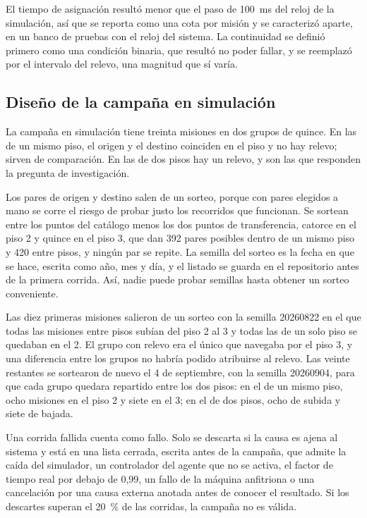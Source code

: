 El tiempo de asignación resultó menor que el paso de 100~ms del reloj de la
simulación, así que se reporta como una cota por misión y se caracterizó aparte,
en un banco de pruebas con el reloj del sistema. La continuidad se definió primero como una condición binaria, que resultó no poder fallar, y se reemplazó por el intervalo del relevo, una magnitud que sí varía.

\subsection{Diseño de la campaña en simulación}

La campaña en simulación tiene treinta misiones en dos grupos de quince. En las de un mismo piso, el origen y el destino coinciden en el piso y no hay relevo; sirven de comparación. En las de dos pisos hay un relevo, y son las que responden la pregunta de investigación.

Los pares de origen y destino salen de un sorteo, porque con pares elegidos a mano se corre el riesgo de probar justo los recorridos que funcionan. Se sortean entre los puntos del catálogo menos los dos puntos de transferencia, catorce en el piso 2 y quince en el piso 3, que dan 392 pares posibles dentro de un mismo piso y 420 entre pisos, y ningún par se repite. La semilla del sorteo es la fecha en que se hace, escrita como año, mes y día, y el listado se guarda en el repositorio antes de la primera corrida. Así, nadie puede probar semillas hasta obtener un sorteo conveniente.

Las diez primeras misiones salieron de un sorteo con la semilla 20260822 en el que todas las misiones entre pisos subían del piso 2 al 3 y todas las de un solo piso se quedaban en el 2. El grupo con relevo era el único que navegaba por el piso 3, y una diferencia entre los grupos no habría podido atribuirse al relevo. Las veinte restantes se sortearon de nuevo el 4 de septiembre, con la semilla 20260904, para que cada grupo quedara repartido entre los dos pisos: en el de un mismo piso, ocho misiones en el piso 2 y siete en el 3; en el de dos pisos, ocho de subida y siete de bajada.

Una corrida fallida cuenta como fallo. Solo se descarta si la causa es ajena al sistema y está en una lista cerrada, escrita antes de la campaña, que admite la caída del simulador, un controlador del agente que no
se activa, el factor de tiempo real por debajo de 0,99, un fallo de la máquina
anfitriona o una cancelación por una causa externa anotada antes de conocer el
resultado. Si los descartes superan el 20~\% de las corridas, la campaña no es
válida.

